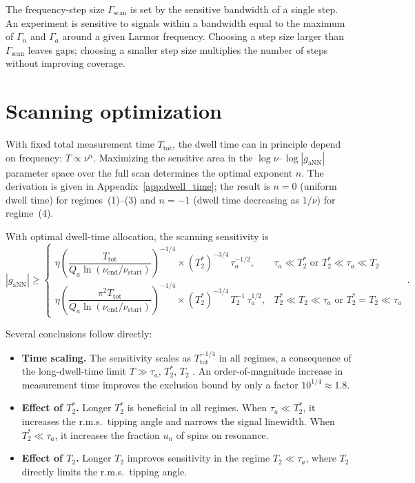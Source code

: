 The frequency-step size $\Gamma_{\mathrm{scan}}$ is set by the sensitive bandwidth of a single step. An experiment is sensitive to signals within a bandwidth equal to the maximum of $\Gamma_n$ and $\Gamma_a$ around a given Larmor frequency. Choosing a step size larger than $\Gamma_{\mathrm{scan}}$ leaves gaps; choosing a smaller step size multiplies the number of steps without improving coverage.

\section{Scanning optimization}\label{sec:results:optimization}

With fixed total measurement time $T_{\mathrm{tot}}$, the dwell time can in principle depend on frequency: $T \propto \nu^n$. Maximizing the sensitive area in the $\log\nu$--$\log|g_{\mathrm{aNN}}|$ parameter space over the full scan determines the optimal exponent $n$. The derivation is given in Appendix~\ref{app:dwell_time}; the result is $n=0$ (uniform dwell time) for regimes~(1)--(3) and $n=-1$ (dwell time decreasing as $1/\nu$) for regime~(4).

With optimal dwell-time allocation, the scanning sensitivity is
\begin{equation}
    |g_{\mathrm{aNN}}| \geqslant \left\{
    \begin{array}{ll}
    \eta
    \left(\dfrac{T_{\mathrm{tot}}}{Q_a\ln\!\left(\nu_{\mathrm{end}}/\nu_{\mathrm{start}} \right)}\right)^{-1/4}
     \times  (T_2^*)^{-3/4}\, \tau_a^{-1/2},
    & \tau_a\ll T_2^* \text{ or }  T_2^*\ll\tau_a\ll T_2 \\[10pt]
    \eta
    \left(\dfrac{\pi^2 T_{\mathrm{tot}}}{Q_a\ln\!\left(\nu_{\mathrm{end}}/\nu_{\mathrm{start}} \right)}\right)^{-1/4}
     \times  (T_2^*)^{-3/4}\, T_2^{-1}\, \tau_a^{1/2},
    & T_2^* \ll T_2 \ll \tau_a \text{ or } T_2^*=T_2 \ll \tau_a
    \end{array} \right.
    \,.\label{eq:gaNN_Ttot_optimal}
\end{equation}

Several conclusions follow directly:
\begin{itemize}
    \item \textbf{Time scaling.} The sensitivity scales as $T_{\mathrm{tot}}^{-1/4}$ in all regimes, a consequence of the long-dwell-time limit $T \gg \tau_a,\,T_2^*,\,T_2$ \cite{CASPErProposal2014,Aybas_2021_Quantum_sensitivity}. An order-of-magnitude increase in measurement time improves the exclusion bound by only a factor $10^{1/4}\approx1.8$.

    \item \textbf{Effect of $T_2^*$.} Longer $T_2^*$ is beneficial in all regimes. When $\tau_a \ll T_2^*$, it increases the r.m.s.\ tipping angle and narrows the signal linewidth. When $T_2^* \ll \tau_a$, it increases the fraction $u_n$ of spins on resonance.

    \item \textbf{Effect of $T_2$.} Longer $T_2$ improves sensitivity in the regime $T_2 \ll \tau_a$, where $T_2$ directly limits the r.m.s.\ tipping angle.
\end{itemize}

